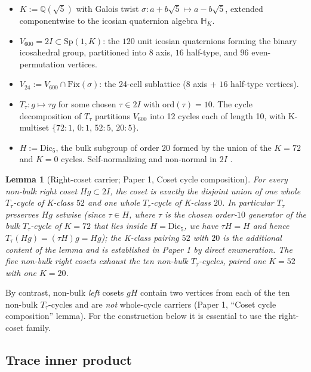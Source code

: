\documentclass[11pt]{article}
\newtheorem{lemma}{Lemma}[section]
\newcommand{\twoI}{2I}
\newcommand{\Vsixhundred}{V_{600}}
\newcommand{\Dicfive}{\mathrm{Dic}_5}
\newcommand{\Vtwentyfour}{V_{24}}
\newcommand{\sigmaG}{\sigma}
\newcommand{\Ttau}{T_{\tau}}
\begin{document}
\begin{itemize}[leftmargin=2em]
\item $K := \mathbb{Q}(\sqrt{5})$ with Galois twist
$\sigmaG : a + b\sqrt{5} \mapsto a - b\sqrt{5}$, extended componentwise
to the icosian quaternion algebra $\mathbb{H}_K$.
\item $\Vsixhundred = \twoI \subset \mathrm{Sp}(1, K)$: the $120$ unit
icosian quaternions forming the binary icosahedral group, partitioned
into $8$ axis, $16$ half-type, and $96$ even-permutation vertices.
\item $\Vtwentyfour := \Vsixhundred \cap \mathrm{Fix}(\sigmaG)$: the
24-cell sublattice ($8$ axis + $16$ half-type vertices).
\item $\Ttau : g \mapsto \tau g$ for some chosen $\tau \in \twoI$ with
$\mathrm{ord}(\tau) = 10$. The cycle decomposition of $\Ttau$
partitions $\Vsixhundred$ into 12 cycles each of length 10, with
K-multiset $\{72{:}1,\,0{:}1,\,52{:}5,\,20{:}5\}$.
\item $H := \Dicfive$, the bulk subgroup of order $20$ formed by the
union of the $K=72$ and $K=0$ cycles. Self-normalizing and non-normal
in $\twoI$ \citep{V600Paper1}.
\end{itemize}

\begin{lemma}[Right-coset carrier; Paper 1, Coset cycle composition]\label{lem:rightcoset}
For every non-bulk right coset $Hg \subset \twoI$, the coset is
exactly the disjoint union of one whole $\Ttau$-cycle of K-class $52$
and one whole $\Ttau$-cycle of K-class $20$. In particular $\Ttau$
preserves $Hg$ setwise (since $\tau \in H$, where $\tau$ is the chosen
order-$10$ generator of the bulk $\Ttau$-cycle of $K=72$ that lies
inside $H = \Dicfive$, we have $\tau H = H$ and hence
$\Ttau(Hg) = (\tau H) g = Hg$); the K-class pairing $52$ with
$20$ is the additional content of the lemma and is established in
Paper 1 by direct enumeration. The five non-bulk right cosets
exhaust the ten non-bulk $\Ttau$-cycles, paired one $K=52$ with one
$K=20$.
\end{lemma}

By contrast, non-bulk \emph{left} cosets $gH$ contain two vertices from
each of the ten non-bulk $\Ttau$-cycles and are \emph{not} whole-cycle
carriers (Paper 1, ``Coset cycle composition'' lemma). For the construction below it is
essential to use the right-coset family.

\subsection{Trace inner product}
\end{document}
